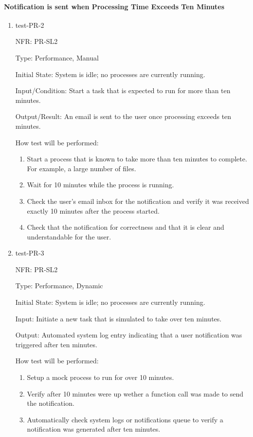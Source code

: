 \documentclass[12pt, titlepage]{article}
\begin{document}
\paragraph{Notification is sent when Processing Time Exceeds Ten Minutes}
\begin{enumerate}
  \item{test-PR-2}

  NFR: PR-SL2

  Type: Performance, Manual
            
  Initial State: System is idle; no processes are currently running.
            
  Input/Condition: Start a task that is expected to run for more than ten minutes.
            
  Output/Result: An email is sent to the user once processing exceeds ten minutes.
            
  How test will be performed: 
  \begin{enumerate}
    \item Start a process that is known to take more than ten minutes to complete. For example, a large number of files.
    \item Wait for 10 minutes while the process is running.
    \item Check the user's email inbox for the notification and verify it was received exactly 10 minutes after the process started.
    \item Check that the notification for correctness and that it is clear and understandable for the user.
  \end{enumerate}

  \item{test-PR-3}

  NFR: PR-SL2

  Type: Performance, Dynamic
            
  Initial State: System is idle; no processes are currently running.
            
  Input: Initiate a new task that is simulated to take over ten minutes.
            
  Output: Automated system log entry indicating that a user notification was triggered after ten minutes.
            
  How test will be performed: 
  \begin{enumerate}
    \item {Setup a mock process to run for over 10 minutes.}
    \item {Verify after 10 minutes were up wether a function call was made to send the notification.}
    \item {Automatically check system logs or notifications queue to verify a notification was generated after ten minutes.}
  \end{enumerate}
\end{enumerate}
\end{document}
